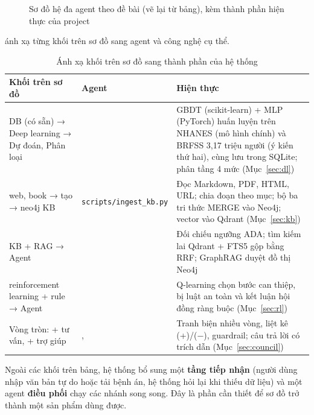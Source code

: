 \begin{figure}[H]
\caption{Sơ đồ hệ đa agent theo đề bài (vẽ lại từ bảng), kèm thành phần hiện thực của project}
\label{fig:board}
\end{figure}

 ánh xạ từng khối trên sơ đồ sang agent và công nghệ cụ thể.

\begin{table}[H]
\centering
\caption{Ánh xạ khối trên sơ đồ sang thành phần của hệ thống}
\label{tab:board-map}
\small
\begin{tabularx}{\linewidth}{@{}L{3.3cm}L{3.6cm}Y@{}}
\toprule
\textbf{Khối trên sơ đồ} & \textbf{Agent} & \textbf{Hiện thực} \\
\midrule
DB (có sẵn) → Deep learning → Dự đoán, Phân loại &  & GBDT (scikit-learn) + MLP (PyTorch) huấn luyện trên NHANES (mô hình chính) và BRFSS 3,17 triệu người (ý kiến thứ hai), cùng lưu trong SQLite; phân tầng 4 mức (Mục~\ref{sec:dl}) \\
web, book → tạo → neo4j KB & \texttt{scripts/ingest\_kb.py} & Đọc Markdown, PDF, HTML, URL; chia đoạn theo mục; bộ ba tri thức MERGE vào Neo4j; vector vào Qdrant (Mục~\ref{sec:kb}) \\
KB + RAG → Agent &  & Đối chiếu ngưỡng ADA; tìm kiếm lai Qdrant + FTS5 gộp bằng RRF; GraphRAG duyệt đồ thị Neo4j \\
reinforcement learning + rule → Agent &  & Q-learning chọn bước can thiệp, bị luật an toàn và kết luận hội đồng ràng buộc (Mục~\ref{sec:rl}) \\
Vòng tròn: + tư vấn, + trợ giúp & ,  & Tranh biện nhiều vòng, liệt kê (+)/(−), guardrail; câu trả lời có trích dẫn (Mục~\ref{sec:council}) \\
\bottomrule
\end{tabularx}
\end{table}

Ngoài các khối trên bảng, hệ thống bổ sung một \textbf{tầng tiếp nhận} (người dùng nhập văn bản tự do hoặc tải bệnh án, hệ thống hỏi lại khi thiếu dữ liệu) và một agent \textbf{điều phối} chạy các nhánh song song. Đây là phần cần thiết để sơ đồ trở thành một sản phẩm dùng được.

